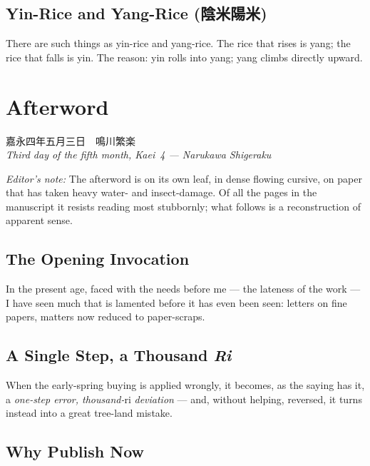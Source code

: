 \documentclass[10pt, openany]{book}
\newcommand{\jp}[1]{{\japanesefont #1}}
\newenvironment{editorialnote}{%
  \begin{editorbox}\small\textit{Editor's note:}\enspace}{\end{editorbox}}
\begin{document}
\section{Yin-Rice and Yang-Rice (\jp{陰米陽米})}

There are such things as yin-rice and yang-rice. The rice that
rises is yang; the rice that falls is yin. The reason: yin rolls
into yang; yang climbs directly upward.

\chapter{Afterword}

\begin{center}
\jp{嘉永四年五月三日　鳴川繁楽}\\[0.3em]
\textit{Third day of the fifth month, Kaei~4 --- Narukawa Shigeraku}
\end{center}

\begin{editorialnote}
The afterword is on its own leaf, in dense flowing cursive, on
paper that has taken heavy water- and insect-damage. Of all the
pages in the manuscript it resists reading most stubbornly; what
follows is a reconstruction of apparent
sense.
\end{editorialnote}

\section{The Opening Invocation}

In the present age, faced with the needs before me --- the lateness
of the work --- I have seen much that is lamented before it has
even been seen: letters on fine papers, matters now reduced to
paper-scraps.

\section{A Single Step, a Thousand \textit{Ri}}

When the early-spring buying is applied wrongly, it becomes, as
the saying has it, a \textit{one-step error, thousand-}ri
\textit{deviation} --- and, without helping, reversed, it turns
instead into a great tree-land mistake.

\section{Why Publish Now}
\end{document}
